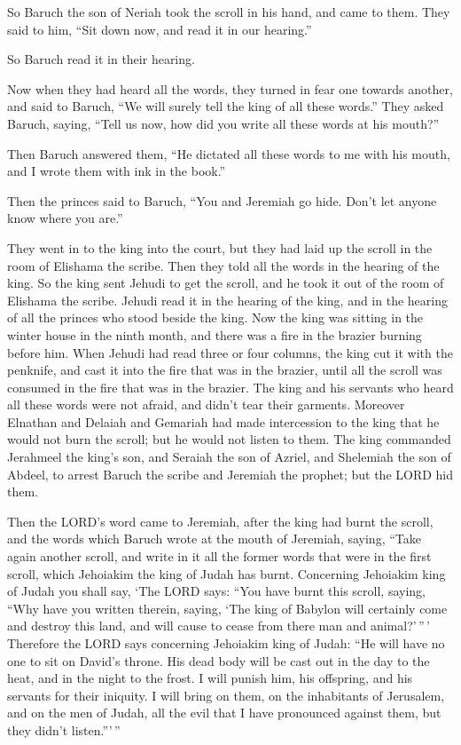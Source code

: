So Baruch the son of Neriah took the scroll in his hand, and came to
them.  They said to him, ``Sit down now, and read it in our
hearing.''

So Baruch read it in their hearing.

 Now when they had heard all the words, they turned in fear
one towards another, and said to Baruch, ``We will surely tell the king
of all these words.''  They asked Baruch, saying, ``Tell us
now, how did you write all these words at his mouth?''

 Then Baruch answered them, ``He dictated all these words
to me with his mouth, and I wrote them with ink in the book.''

 Then the princes said to Baruch, ``You and Jeremiah go
hide. Don't let anyone know where you are.''

 They went in to the king into the court, but they had laid
up the scroll in the room of Elishama the scribe. Then they told all the
words in the hearing of the king.  So the king sent Jehudi
to get the scroll, and he took it out of the room of Elishama the
scribe. Jehudi read it in the hearing of the king, and in the hearing of
all the princes who stood beside the king.  Now the king
was sitting in the winter house in the ninth month, and there was a fire
in the brazier burning before him.  When Jehudi had read
three or four columns, the king cut it with the penknife, and cast it
into the fire that was in the brazier, until all the scroll was consumed
in the fire that was in the brazier.  The king and his
servants who heard all these words were not afraid, and didn't tear
their garments.  Moreover Elnathan and Delaiah and Gemariah
had made intercession to the king that he would not burn the scroll; but
he would not listen to them.  The king commanded Jerahmeel
the king's son, and Seraiah the son of Azriel, and Shelemiah the son of
Abdeel, to arrest Baruch the scribe and Jeremiah the prophet; but the
LORD hid them.

 Then the LORD's word came to Jeremiah, after the king had
burnt the scroll, and the words which Baruch wrote at the mouth of
Jeremiah, saying,  ``Take again another scroll, and write
in it all the former words that were in the first scroll, which
Jehoiakim the king of Judah has burnt.  Concerning
Jehoiakim king of Judah you shall say, `The LORD says: ``You have burnt
this scroll, saying, ``Why have you written therein, saying, `The king
of Babylon will certainly come and destroy this land, and will cause to
cease from there man and animal?'\,''\,'  Therefore the
LORD says concerning Jehoiakim king of Judah: ``He will have no one to
sit on David's throne. His dead body will be cast out in the day to the
heat, and in the night to the frost.  I will punish him,
his offspring, and his servants for their iniquity. I will bring on
them, on the inhabitants of Jerusalem, and on the men of Judah, all the
evil that I have pronounced against them, but they didn't listen.'''\,''

